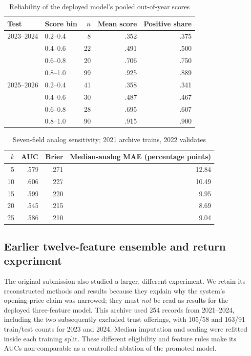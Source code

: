 \documentclass[runningheads]{llncs}
\begin{document}
\begin{table}[tb]
\caption{Reliability of the deployed model's pooled out-of-year scores}\label{tab:reliability}
\centering\small
\begin{tabular}{@{}llrrr@{}}\toprule
Test & Score bin & $n$ & Mean score & Positive share\\\midrule
2023--2024 & 0.2--0.4 & 8 & .352 & .375\\
 & 0.4--0.6 & 22 & .491 & .500\\
 & 0.6--0.8 & 20 & .706 & .750\\
 & 0.8--1.0 & 99 & .925 & .889\\
2025--2026 & 0.2--0.4 & 41 & .358 & .341\\
 & 0.4--0.6 & 30 & .487 & .467\\
 & 0.6--0.8 & 28 & .695 & .607\\
 & 0.8--1.0 & 90 & .915 & .900\\\bottomrule
\end{tabular}
\end{table}
\begin{table}[tb]
\caption{Seven-field analog sensitivity; 2021 archive trains, 2022 validates}\label{tab:knn}
\centering
\begin{tabular}{@{}rrrr@{}}\toprule
$k$ & AUC & Brier & Median-analog MAE (percentage points)\\\midrule
5 & .579 & .271 & 12.84\\
10 & .606 & .227 & 10.49\\
15 & .599 & .220 & 9.95\\
20 & .545 & .215 & 8.69\\
25 & .586 & .210 & 9.04\\\bottomrule
\end{tabular}
\end{table}

\subsection{Earlier twelve-feature ensemble and return experiment}
The original submission also studied a larger, different experiment. We retain its reconstructed methods and results because they explain why the system's opening-price claim was narrowed; they must \emph{not} be read as results for the deployed three-feature model. This archive used 254 records from 2021--2024, including the two subsequently excluded trust offerings, with 105/58 and 163/91 train/test counts for 2023 and 2024. Median imputation and scaling were refitted inside each training split. These different eligibility and feature rules make its AUCs non-comparable as a controlled ablation of the promoted model.
\end{document}
